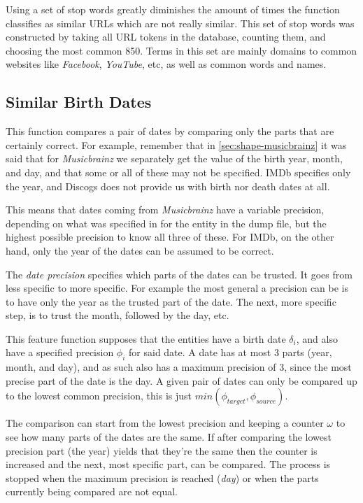 \documentclass[epsfig,a4paper,11pt,titlepage,twoside,openany]{book}
\begin{document}
Using a set of stop words greatly diminishes the amount of times the function classifies as similar URLs which are not really similar. This set of stop words was constructed by taking all URL tokens in the database, counting them, and choosing the most common 850. Terms in this set are mainly domains to common websites like \textit{Facebook}, \textit{YouTube}, etc, as well as common words and names.


\subsection{Similar Birth Dates}
\label{sec:feature-similar-birth-dates}
 
 This function compares a pair of dates by comparing only the parts that are certainly correct. For example, remember that in \autoref{sec:shape-musicbrainz} it was said that for \textit{Musicbrainz} we separately get the value of the birth year, month, and day, and that some or all of these may not be specified. IMDb specifies only the year, and Discogs does not provide us with birth nor death dates at all. 
 
 This means that dates coming from \textit{Musicbrainz} have a variable precision, depending on what was specified in for the entity in the dump file, but the highest possible precision to know all three of these. For IMDb, on the other hand, only the year of the dates can be assumed to be correct.
 
 The \textit{date precision} specifies which parts of the dates can be trusted. It goes from less specific to more specific. For example the most general a precision can be is to have only the year as the trusted part of the date. The next, more specific step, is to trust the month, followed by the day, etc.
 
This feature function supposes that the entities have a birth date $\delta_i$, and also have a specified precision $\phi_i$ for said date. A date has at most 3 parts (year, month, and day), and as such also has a maximum precision of 3, since the most precise part of the date is the day. A given pair of dates can only be compared up to the lowest common precision, this is just $min(\phi_{target}, \phi_{source})$. 

The comparison can start from the lowest precision and keeping a counter $\omega$ to see how many parts of the dates are the same. If after comparing the lowest precision part (the year) yields that they're the same then the counter is increased and the next, most specific part, can be compared. The process is stopped when the maximum precision is reached (\textit{day}) or when the parts currently being compared are not equal.
\end{document}
